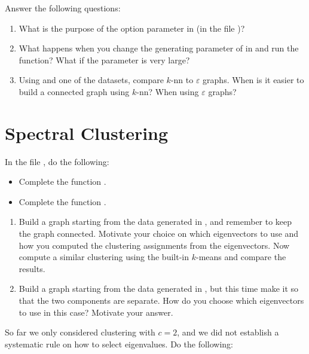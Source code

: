 \documentclass{article}
\begin{document}
Answer the following questions: 

\begin{enumerate}[resume]
	
    \item What is the purpose of the option parameter in  (in the file )?
    \item  What happens when you change the generating parameter of
         in 
        and run the function? What if the parameter is very large?
    \item Using  and one of the datasets,
        compare $k$-nn to $\varepsilon$ graphs. When is it easier to build
        a connected graph using $k$-nn? When using $\varepsilon$ graphs?
\end{enumerate}


\section{Spectral Clustering}

In the file , do the following: 

\begin{itemize}
	\item Complete the function .
	\item Complete the function .
\end{itemize}



\begin{enumerate}
    \item Build a graph starting from the data generated in
        , and remember to keep
        the graph connected.
        Motivate your choice on which eigenvectors to use
        and how you computed the clustering assignments from the eigenvectors.
        Now compute a similar clustering using the
        built-in $k$-means and compare the results.
    \item Build a graph starting from the data generated in
        , but this time
        make it so that the two components are separate.
        How do you choose which eigenvectors to use in this case?
        Motivate your answer.
\end{enumerate}


So far we only considered clustering with $c=2$, and we did not establish
a systematic rule on how to select eigenvalues.  Do the following:
\end{document}
